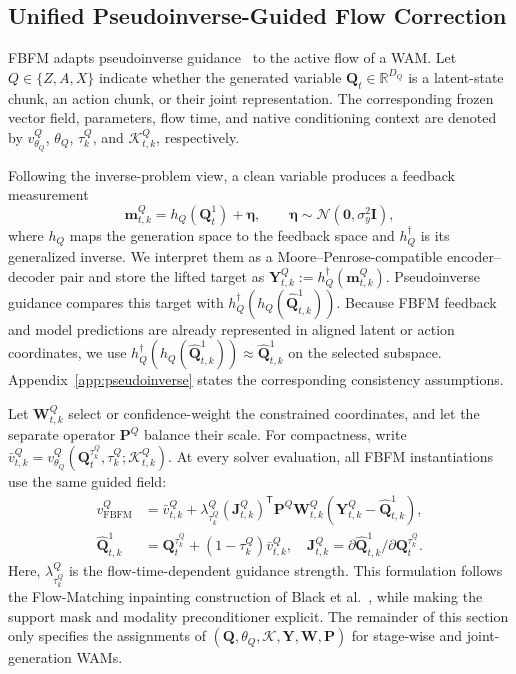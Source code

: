 \subsection{Unified Pseudoinverse-Guided Flow Correction}
\label{sec:method:unified-guidance}

FBFM adapts pseudoinverse guidance~\cite{song2023pseudoinverse} to the active
flow of a WAM. Let $Q\in\{Z,A,X\}$ indicate whether the generated variable
$\mathbf Q_t\in\mathbb R^{D_Q}$ is a latent-state chunk, an action chunk, or
their joint representation. The corresponding frozen vector field, parameters,
flow time, and native conditioning context are denoted by
$v_{\theta_Q}^Q$, $\theta_Q$, $\tau_k^Q$, and
$\mathcal K_{t,k}^Q$, respectively.

Following the inverse-problem view, a clean variable produces a feedback
measurement
\begin{equation}
    \mathbf m_{t,k}^Q
    =h_Q(\mathbf Q_t^1)+\boldsymbol\eta,
    \qquad
    \boldsymbol\eta\sim\mathcal N(\mathbf 0,\sigma_y^2\mathbf I),
    \label{eq:fbfm-measurement}
\end{equation}
where $h_Q$ maps the generation space to the feedback space and
$h_Q^\dagger$ is its generalized inverse. We interpret them as a
Moore--Penrose-compatible encoder--decoder pair and store the lifted target as
$\mathbf Y_{t,k}^Q:=h_Q^\dagger(\mathbf m_{t,k}^Q)$. Pseudoinverse guidance
compares this target with
$h_Q^\dagger(h_Q(\hat{\mathbf Q}_{t,k}^1))$. Because FBFM feedback and model
predictions are already represented in aligned latent or action coordinates, we
use
$h_Q^\dagger(h_Q(\hat{\mathbf Q}_{t,k}^1))\approx
\hat{\mathbf Q}_{t,k}^1$ on the selected subspace. Appendix~\ref{app:pseudoinverse}
states the corresponding consistency assumptions.

Let $\mathbf W_{t,k}^Q$ select or confidence-weight the constrained
coordinates, and let the separate operator $\mathbf P^Q$ balance their scale.
For compactness, write
$\bar v_{t,k}^Q
=v_{\theta_Q}^Q(\mathbf Q_t^{\tau_k^Q},\tau_k^Q;\mathcal K_{t,k}^Q)$.
At every solver evaluation, all FBFM instantiations use the same guided field:
\begingroup
\small
\begin{equation}
\begin{aligned}
v_{\mathrm{FBFM}}^Q
&=\bar v_{t,k}^Q+\lambda_{\tau_k^Q}^Q
(\mathbf J_{t,k}^Q)^{\mathsf T}\mathbf P^Q\mathbf W_{t,k}^Q
\!\left(\mathbf Y_{t,k}^Q-\hat{\mathbf Q}_{t,k}^1\right),\\
\hat{\mathbf Q}_{t,k}^1
&=\mathbf Q_t^{\tau_k^Q}+(1-\tau_k^Q)\bar v_{t,k}^Q,\quad
\mathbf J_{t,k}^Q=\partial\hat{\mathbf Q}_{t,k}^1/
\partial\mathbf Q_t^{\tau_k^Q}.
\end{aligned}
\label{eq:fbfm-guided-field}
\end{equation}
\endgroup
Here, $\lambda_{\tau_k^Q}^Q$ is the flow-time-dependent guidance strength.
This formulation follows the Flow-Matching inpainting construction of
Black et al.~\cite{black2025realtime}, while making the support mask and
modality preconditioner explicit. The remainder of this section only specifies
the assignments of
$(\mathbf Q,\theta_Q,\mathcal K,\mathbf Y,\mathbf W,\mathbf P)$ for stage-wise
and joint-generation WAMs.

